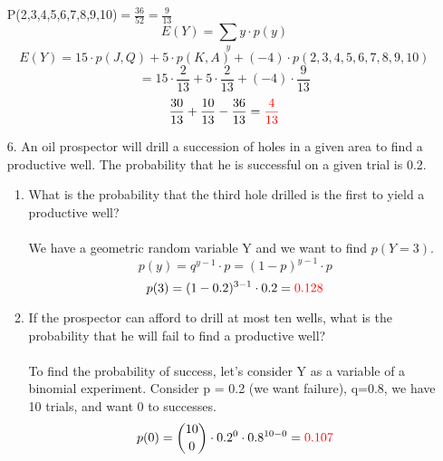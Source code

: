 \documentclass{article}
\newcommand{\expect}{E}
\begin{document}
\begin{enumerate}
        P(2,3,4,5,6,7,8,9,10)$=\frac{36}{52}=\frac{9}{13}$
        \begin{equation*}
            \expect(Y) = \sum\limits_y y\cdot p(y)
        \end{equation*}
        \begin{equation*}
            \expect(Y) = 15 \cdot p(J,Q) + 5 \cdot p(K,A) + (-4) \cdot p(2,3,4,5,6,7,8,9,10)
        \end{equation*}
        \begin{equation*}
            =15 \cdot \frac{2}{13} + 5 \cdot \frac{2}{13} + (-4) \cdot \frac{9}{13}
        \end{equation*}
        \begin{equation*}
            \frac{30}{13} + \frac{10}{13} - \frac{36}{13}=\textcolor{red}{\frac{4}{13}}
        \end{equation*}
        \item[6.] An oil prospector will drill a succession of holes in a given area to find a productive well. The probability that he is successful on a given trial is 0.2.
        \begin{enumerate}
            \item What is the probability that the third hole drilled is the first to yield a productive well?\\\\
            We have a geometric random variable Y and we want to find $p(Y=3)$.
            \begin{equation*}
                p(y)=q^{y-1} \cdot p=(1-p)^{y-1} \cdot p
            \end{equation*}
            \begin{equation*}
                p(3)=(1-0.2)^{3-1} \cdot 0.2=\textcolor{red}{0.128}
            \end{equation*}
            \item If the prospector can afford to drill at most ten wells, what is the probability that he will fail to find a productive well?\\\\
            To find the probability of success, let's consider Y as a variable of a binomial experiment. Consider p = 0.2 (we want failure), q=0.8, we have 10 trials, and want 0 to successes.
            \begin{equation*}
                p(0)=\binom{10}{0}\cdot0.2^{0}\cdot0.8^{10-0}=\textcolor{red}{0.107}
            \end{equation*}
            
        \end{enumerate}
    \end{enumerate}
\end{document}
